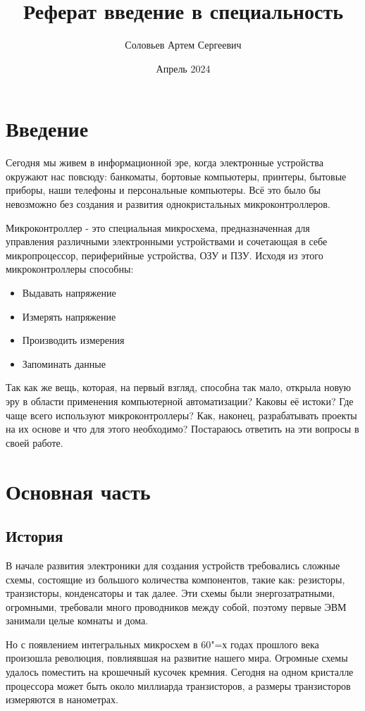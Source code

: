 \documentclass[14pt,a4paper]{extarticle}
\title{Реферат введение в специальность}
\author{Соловьев Артем Сергеевич}
\date{Апрель 2024}
\begin{document}
	
	
	{ \fontsize{14 pt}{10pt} \selectfont
	
	}
	
	\section{Введение}
	
	Сегодня мы живем в информационной эре, когда электронные устройства  окружают нас повсюду: банкоматы, бортовые компьютеры, принтеры, бытовые приборы, наши телефоны и персональные компьютеры. Всё это было бы невозможно без создания и развития однокристальных микроконтроллеров. 
	
	Микроконтроллер - это специальная микросхема, предназначенная для управления различными электронными устройствами и сочетающая в себе микропроцессор, периферийные устройства, ОЗУ и ПЗУ. Исходя из этого микроконтроллеры способны: 
	\begin{itemize}
		\item Выдавать напряжение
		\item Измерять напряжение
		\item Производить измерения
		\item Запоминать данные
	\end{itemize}
	
	Так как же вещь, которая, на первый взгляд, способна так мало, открыла новую эру в области применения компьютерной автоматизации? Каковы её истоки? Где чаще всего используют микроконтроллеры? Как, наконец, разрабатывать проекты на их основе и что для этого необходимо? Постараюсь ответить на эти вопросы в своей работе.
	
	\newpage
	\section{Основная часть}
	
	\subsection{История}
	
	В начале развития электроники для создания устройств требовались сложные схемы, состоящие из большого количества компонентов, такие как: резисторы, транзисторы, конденсаторы и так далее. Эти схемы были энергозатратными, огромными, требовали много проводников между собой, поэтому первые ЭВМ занимали целые комнаты и дома.
	
	Но с появлением интегральных микросхем в 60"=х годах прошлого века произошла революция, повлиявшая на развитие нашего мира. Огромные схемы удалось поместить на крошечный кусочек кремния. Сегодня на одном кристалле процессора может быть около миллиарда транзисторов, а размеры транзисторов измеряются в нанометрах.
	
\end{document}

